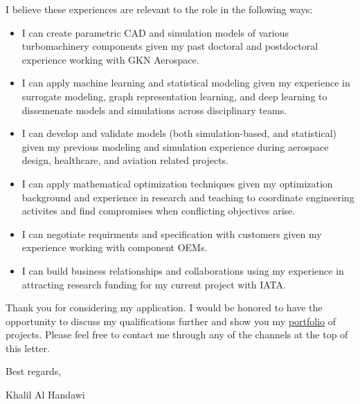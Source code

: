 \documentclass[12pt]{article} %
\begin{document}
\medskip %

I believe these experiences are relevant to the role in the following ways: 

\begin{itemize}
	\item I can create parametric CAD and simulation models of various turbomachinery components given my past doctoral and postdoctoral experience working with GKN Aerospace.
	\item I can apply machine learning and statistical modeling given my experience in surrogate modeling, graph representation learning, and deep learning to dissemenate models and simulations across disciplinary teams.
	\item I can develop and validate models (both simulation-based, and statistical) given my previous modeling and simulation experience during aerospace design, healthcare, and aviation related projects.
	\item I can apply mathematical optimization techniques given my optimization background and experience in research and teaching to coordinate engineering activites and find compromises when conflicting objectives arise.
	\item I can negotiate requirments and specification with customers given my experience working with component OEMs.
	\item I can build business relationships and collaborations using my experience in attracting research funding for my current project with IATA.
\end{itemize}

\medskip %

Thank you for considering my application. I would be honored to have the opportunity to discuss my qualifications further and show you my \href{https://khbalhandawi.github.io/projects/}{portfolio} of projects. Please feel free to contact me through any of the channels at the top of this letter.

\medskip %

Best regards,

\medskip %


Khalil Al Handawi


\medskip %

\end{document}
